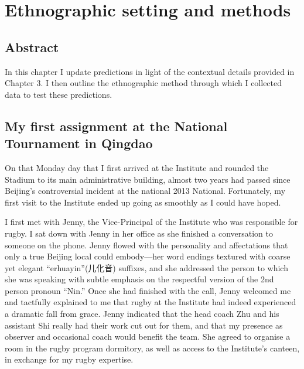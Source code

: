 \chapter{\label{chap:ethnoSetting} Ethnographic setting and methods}

  \minitoc



\section{Abstract}
In this chapter I update predictions in light of the contextual details provided in Chapter 3.  I then outline the ethnographic method through which I collected data to test these predictions.

                                        \begin{CJK}{UTF8}{gbsn}

\section{My first assignment at the National Tournament in Qingdao \label{sect:qingdaoVignette}}

On that Monday day that I first arrived at the Institute and rounded the Stadium to its main administrative building, almost two years had passed since Beijing's controversial incident at the national 2013 National.  Fortunately, my first visit to the Institute ended up going as smoothly as I could have hoped.

I first met with Jenny, the Vice-Principal of the Institute who was responsible for rugby.  I sat down with Jenny in her office as she finished a conversation to someone on the phone. Jenny flowed with the personality and affectations that only a true Beijing local could embody---her word endings textured with coarse yet elegant ``erhuayin''(儿化音) suffixes, and she addressed the person to which she was speaking with subtle emphasis on the respectful version of the 2nd person pronoun ``Nin.''  Once she had finished with the call, Jenny welcomed me and tactfully explained to me that rugby at the Institute had indeed experienced a dramatic fall from grace.  Jenny indicated that the head coach Zhu and his assistant Shi really had their work cut out for them, and that my presence as observer and occasional coach would benefit the team.  She agreed to organise a room in the rugby program dormitory, as well as access to the Institute's canteen, in exchange for my rugby expertise.


\end{CJK}
